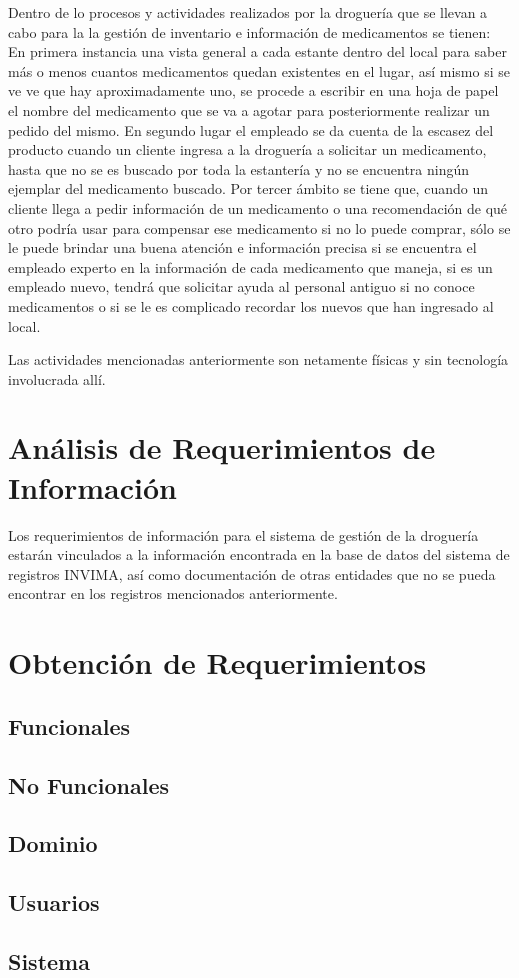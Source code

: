Dentro de lo procesos y actividades realizados por la droguería que se llevan a cabo para la la gestión de inventario e información de medicamentos se tienen:
En primera instancia una vista general a cada estante dentro del local para saber más o menos cuantos medicamentos quedan existentes en el lugar, así mismo si se ve ve que hay aproximadamente uno, se procede a escribir en una hoja de papel el nombre del medicamento que se va a agotar para posteriormente realizar un pedido del mismo. 
En segundo lugar el empleado se da cuenta de la escasez del producto cuando un cliente ingresa a la droguería a solicitar un medicamento, hasta que no se es buscado por toda la estantería  y no se encuentra ningún ejemplar del medicamento buscado. 
Por tercer ámbito se tiene que, cuando un cliente llega a pedir información de un medicamento o una recomendación de qué otro podría usar para compensar ese medicamento si no lo puede comprar, sólo se le puede brindar una buena atención e información precisa si se encuentra el empleado experto en la información de cada medicamento que maneja, si es un empleado nuevo, tendrá que solicitar ayuda al personal antiguo si no conoce medicamentos o si se le es complicado recordar los nuevos que han ingresado al local.

Las actividades mencionadas anteriormente son netamente físicas y sin tecnología involucrada allí.


\section{An\'alisis de Requerimientos de Informaci\'on}

Los requerimientos de información para el sistema de gestión de la droguería estarán vinculados a la información encontrada en la base de datos del sistema de registros INVIMA, así como documentación de otras entidades que no se pueda encontrar en los registros mencionados anteriormente.


\section{Obtenci\'on de Requerimientos}
\subsection{Funcionales}

\subsection{No Funcionales}

\subsection{Dominio}

\subsection{Usuarios}

\subsection{Sistema}
